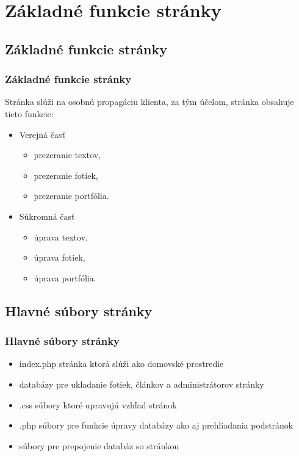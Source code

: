 
\label{Základné funkcie stránky}
\section{Základné funkcie stránky}
\subsection{Základné funkcie stránky}
\begin{frame}\frametitle{Základné funkcie stránky}

Stránka slúži na osobnú propagáciu klienta, za tým účelom, stránka obsahuje tieto funkcie:

  \begin{itemize}

        \item Verejná časť

           \begin{itemize}
                \item prezeranie textov,
                \item prezeranie fotiek,
                \item prezeranie portfólia.
            \end{itemize}
         \item Súkromná časť

         \begin{itemize}
            \item úprava textov,
             \item úprava fotiek,
             \item úprava portfólia.
       \end{itemize}
  \end{itemize}
\end{frame}


\subsection{Hlavné súbory stránky}
\begin{frame}\frametitle{Hlavné súbory stránky}

    \begin{itemize}

         \item index.php stránka ktorá slúži ako domovské prostredie
         \item databázy pre ukladanie fotiek, článkov a administrátorov stránky
         \item .css súbory ktoré upravujú vzhľad stránok
         \item .php súbory pre funkcie úpravy databázy ako aj prehliadania podstránok
         \item súbory pre prepojenie databáz so stránkou
  \end{itemize}
\end{frame}




